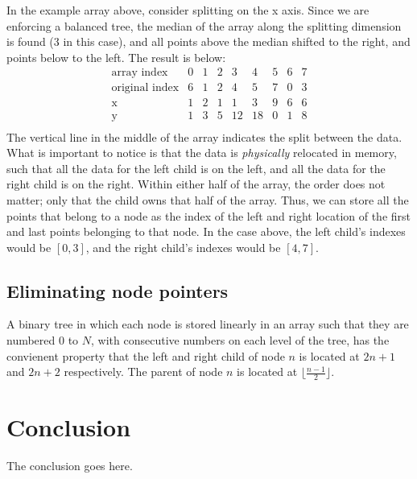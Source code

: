\documentclass[journal]{IEEEtran}
\begin{document}
In the example array above, consider splitting on the x axis. Since we are
enforcing a balanced tree, the median of the array along the splitting
dimension is found (3 in this case), and all points above the median shifted to
the right, and points below to the left. The result is below:
\begin{equation*}
    \begin{array}{r||cccc|cccc}
    \textrm{array~index}     & 0 & 1 & 2 & 3  & 4  & 5 & 6 & 7 \\
    \textrm{original~index}  & 6 & 1 & 2 & 4  & 5  & 7 & 0 & 3 \\
    \textrm{x}               & 1 & 2 & 1 & 1  & 3  & 9 & 6 & 6 \\
    \textrm{y}               & 1 & 3 & 5 & 12 & 18 & 0 & 1 & 8 \\
    \end{array}
\end{equation*}
The vertical line in the middle of the array indicates the split between the
data. What is important to notice is that the data is {\em physically}
relocated in memory, such that all the data for the left child is on the left,
and all the data for the right child is on the right. Within either half of the
array, the order does not matter; only that the child owns that half of the
array. Thus, we can store all the points that belong to a node as the index of
the left and right location of the first and last points belonging to that node.
In the case above, the left child's indexes would be $[0,3]$, and the right
child's indexes would be $[4,7]$. 

\subsection{Eliminating node pointers}
A binary tree in which each node is stored linearly in an array such that they
are numbered $0$ to $N$, with consecutive numbers on each level of the tree,
has the convienent property that the left and right child of node $n$ is
located at $2n+1$ and $2n+2$ respectively. The parent of node $n$ is located at
$\lfloor \frac{n-1}{2} \rfloor$.


\section{Conclusion}
The conclusion goes here.


\end{document}
